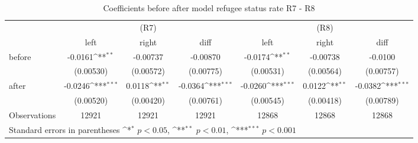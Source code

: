 \begin{table}[!ht]\centering \footnotesize
\def\sym#1{\ifmmode^{#1}\else\(^{#1}\)\fi}
\caption{Coefficients before after model refugee status rate R7 - R8}
\begin{tabular}{l*{6}{c}}
\hline\hline
                    &\multicolumn{3}{c}{(R7)}&\multicolumn{3}{c}{(R8)}\\
&\multicolumn{1}{c}{left}&\multicolumn{1}{c}{right}&\multicolumn{1}{c}{diff}&\multicolumn{1}{c}{left}&\multicolumn{1}{c}{right}&\multicolumn{1}{c}{diff}\\
\hline
before              &     -0.0161\sym{**} &    -0.00737         &    -0.00870         &     -0.0174\sym{**} &    -0.00738         &     -0.0100         \\
                    &   (0.00530)         &   (0.00572)         &   (0.00775)         &   (0.00531)         &   (0.00564)         &   (0.00757)         \\
[0,5em]
after               &     -0.0246\sym{***}&      0.0118\sym{**} &     -0.0364\sym{***}&     -0.0260\sym{***}&      0.0122\sym{**} &     -0.0382\sym{***}\\
                    &   (0.00520)         &   (0.00420)         &   (0.00761)         &   (0.00545)         &   (0.00418)         &   (0.00789)         \\
\hline
Observations        &       12921         &       12921         &       12921         &       12868         &       12868         &       12868         \\
\hline\hline
\multicolumn{7}{l}{\footnotesize Standard errors in parentheses \sym{*} \(p<0.05\), \sym{**} \(p<0.01\), \sym{***} \(p<0.001\)}\\
\end{tabular}
\end{table}
